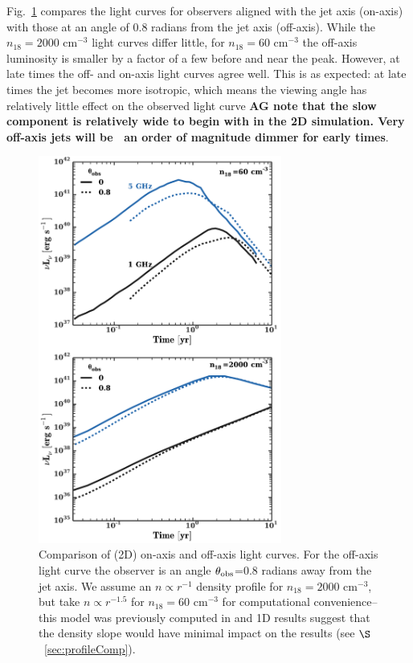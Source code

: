 \documentclass[usenatbib,fleqn]{mnras}
\begin{document}
Fig.~\ref{fig:onOff} compares the light curves for observers aligned
with the jet axis (on-axis) with those at an angle of 0.8 radians from
the jet axis (off-axis).  While the $n_{18}=2000$ cm$^{-3}$ light
curves differ little, for $n_{18}=60$ cm$^{-3}$ the off-axis
luminosity is smaller by a factor of a few before and near the
peak. However, at late times the off- and on-axis light curves agree
well. This is as expected: at late times the jet becomes more
isotropic, which means the viewing angle has relatively little effect
on the observed light curve {\bf AG note that the slow component is
  relatively wide to begin with in the 2D simulation. Very off-axis
  jets will be ~an order of magnitude dimmer for early times}.

\begin{figure}
\includegraphics[width=8cm]{on_off.pdf}
\caption{\label{fig:onOff} Comparison of (2D) on-axis and off-axis
  light curves. For the off-axis light curve the observer is an angle
  $\theta_{\rm obs}$=0.8 radians away from the jet axis. We assume an
  $n\propto r^{-1}$ density profile for $n_{18}=2000$ cm$^{-3}$, but
  take $n\propto r^{-1.5}$ for $n_{18}=60$ cm$^{-3}$ for computational
  convenience--this model was previously computed in
  \citet{Mimica+2015} and 1D results suggest that the density slope
  would have minimal impact on the results (see
  $\S$~\ref{sec:profileComp}).}
\end{figure}
\end{document}
